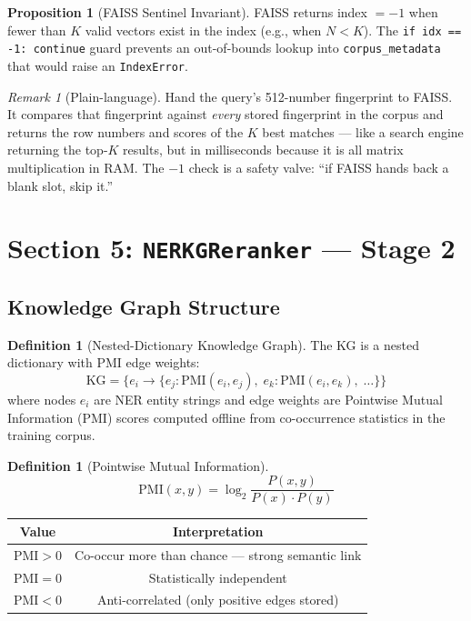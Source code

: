 \documentclass[12pt,a4paper]{article}
\theoremstyle{definition}
\newtheorem{definition}[theorem]{Definition}
\newtheorem{proposition}[theorem]{Proposition}
\theoremstyle{remark}
\newtheorem{remark}[theorem]{Remark}
\begin{document}
\begin{proposition}[FAISS Sentinel Invariant]
FAISS returns index $= -1$ when fewer than $K$ valid vectors exist in the
index (e.g., when $N < K$).
The \texttt{if idx == -1: continue} guard prevents an out-of-bounds lookup
into \texttt{corpus\_metadata} that would raise an \texttt{IndexError}.
\end{proposition}

\begin{remark}[Plain-language]
Hand the query's 512-number fingerprint to FAISS.
It compares that fingerprint against \emph{every} stored fingerprint in
the corpus and returns the row numbers and scores of the $K$ best matches
--- like a search engine returning the top-$K$ results, but in milliseconds
because it is all matrix multiplication in RAM.
The $-1$ check is a safety valve: ``if FAISS hands back a blank slot, skip it.''
\end{remark}

\section{Section 5: \texttt{NERKGReranker} --- Stage 2}

\subsection{Knowledge Graph Structure}

\begin{definition}[Nested-Dictionary Knowledge Graph]
The KG is a nested dictionary with PMI edge weights:
\[
  \text{KG} = \{
    e_i \to \{ e_j : \text{PMI}(e_i, e_j),\; e_k : \text{PMI}(e_i, e_k),\; \ldots \}
  \}
\]
where nodes $e_i$ are NER entity strings and edge weights are
Pointwise Mutual Information (PMI) scores computed offline from
co-occurrence statistics in the training corpus.
\end{definition}

\begin{definition}[Pointwise Mutual Information]
\[
  \text{PMI}(x, y)
  = \log_2 \frac{P(x, y)}{P(x) \cdot P(y)}
\]
\begin{center}
\begin{tabular}{cc}
\toprule
Value & Interpretation \\
\midrule
$\text{PMI} > 0$ & Co-occur more than chance --- strong semantic link \\
$\text{PMI} = 0$ & Statistically independent \\
$\text{PMI} < 0$ & Anti-correlated (only positive edges stored) \\
\bottomrule
\end{tabular}
\end{center}
\end{definition}
\end{document}

